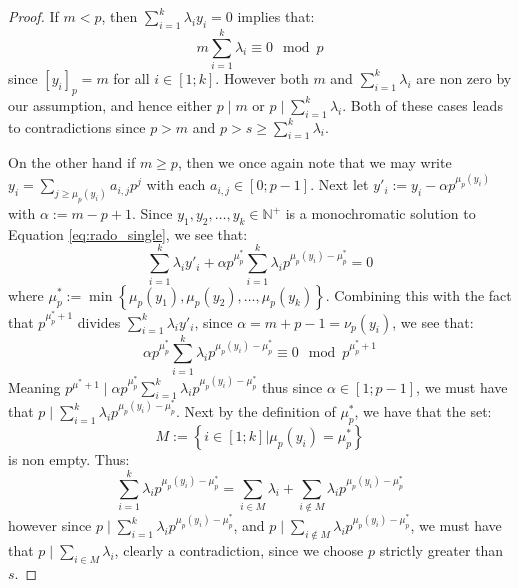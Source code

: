\begin{proof}
	If $m < p$, then $\sum_{i = 1}^k \lambda_i y_i = 0$ implies that:
	\begin{equation*}
		m \sum_{i = 1}^k \lambda_i \equiv 0 \mod p
	\end{equation*}
	since $[y_{i}]_p = m$ for all $i \in [1; k]$.	However both $m$ and $\sum_{i = 1}^k \lambda_{i}$ are non zero by our assumption, and hence either $p \mid m$ or $p \mid \sum_{i = 1}^k \lambda_i$. Both of these cases leads to contradictions since $p > m$ and $p > s \geq \sum_{i = 1}^k \lambda_i $.

	On the other hand if $m \geq p$, then we once again note that we may write $y_i = \sum_{j \geq \mu_p(y_{i})} a_{i,j} p^{j}$ with each $a_{i,j} \in [0; p - 1]$. Next let $y'_i := y_i - \alpha p^{\mu_p(y_{i})}$ with $\alpha := m - p  + 1$. Since $y_1, y_2, \ldots, y_k \in \mathbb{N}^{+}$ is a monochromatic solution to Equation \eqref{eq:rado_single}, we see that:
	\begin{equation*}
		\sum_{i = 1}^k \lambda_iy'_{i} + \alpha p^{\mu_p^{*}} \sum_{i = 1}^{k} \lambda_i p^{\mu_p(y_{i}) - \mu_{p}^{*}} = 0
	\end{equation*}
	where $\mu_{p}^{*} := \min \left\{\mu_{p}(y_1), \mu_{p}(y_2), \ldots, \mu_{p}(y_{k})\right\}$. Combining this with the fact that $p^{\mu^{*}_p + 1}$ divides $\sum_{ i = 1}^{k} \lambda_{i} y'_{i}$, since $\alpha = m + p - 1 = \nu_p(y_{i})$, we see that:
	\begin{equation*}
		\alpha p^{\mu_{p}^{*}} \sum_{i = 1}^k \lambda_i p^{\mu_{p}(y_i) - \mu^{*}_p} \equiv 0 \mod p^{\mu_p^{*} + 1}
	\end{equation*}
	Meaning $p^{\mu^{*} + 1} \mid \alpha p^{\mu_{p}^{*}} \sum_{i = 1}^{k} \lambda_{i} p^{\mu_p(y_i) - \mu^{*}_{p}}$ thus since $\alpha \in [1; p - 1]$, we must have that $p \mid \sum_{i = 1}^k \lambda_i p^{\mu_p(y_i) - \mu^{*}_p}$. Next by the definition of $\mu^{*}_{p}$, we have that the set:
	\begin{equation*}
	M := \left\{i \in [1; k] | \mu_p(y_{i}) = \mu^{*}_{p}\right\}
	\end{equation*}
	is non empty. Thus:
	\begin{equation*}
		\sum_{i = 1}^k \lambda_i p^{\mu_p(y_{i}) - \mu_{p}^{*}} = \sum_{i \in M} \lambda_i + \sum_{i \not \in M} \lambda_i p^{\mu_p(y_{i}) - \mu_p^{*}}
	\end{equation*}
	however since $p \mid \sum_{i = 1}^k \lambda_{i} p^{\mu_p(y_i) - \mu_p^{*}}$, and $p \mid \sum_{i \not \in M} \lambda_i p^{\mu_p(y_i) - \mu_{p}^{*}}$, we must have that $p \mid \sum_{i \in M} \lambda_i$, clearly a contradiction, since we choose $p$ strictly greater than $s$.
\end{proof}

